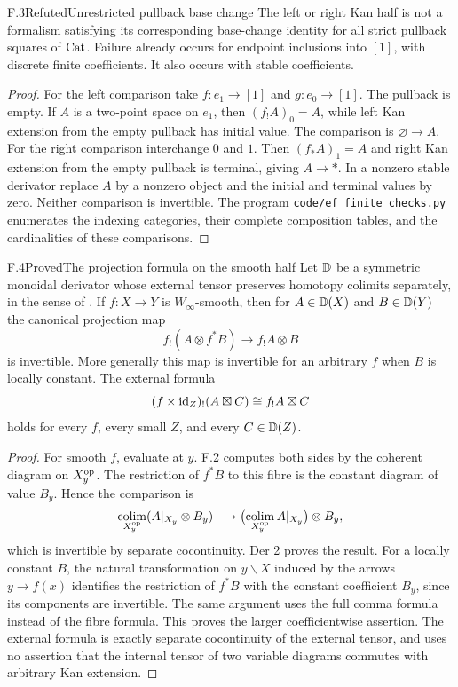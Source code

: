 \begin{claim}{F.3}{Refuted}{Unrestricted pullback base change}
The left or right Kan half is not a formalism satisfying its corresponding base-change identity for all strict pullback squares of $\mathrm{Cat}$. Failure already occurs for endpoint inclusions into $[1]$, with discrete finite coefficients. It also occurs with stable coefficients.
\end{claim}
\begin{proof}
For the left comparison take $f:e_1\to[1]$ and $g:e_0\to[1]$. The pullback is empty. If $A$ is a two-point space on $e_1$, then $(f_!A)_0=A$, while left Kan extension from the empty pullback has initial value. The comparison is $\varnothing\to A$. For the right comparison interchange $0$ and $1$. Then $(f_*A)_1=A$ and right Kan extension from the empty pullback is terminal, giving $A\to *$. In a nonzero stable derivator replace $A$ by a nonzero object and the initial and terminal values by zero. Neither comparison is invertible. The program \texttt{code/ef\_finite\_checks.py} enumerates the indexing categories, their complete composition tables, and the cardinalities of these comparisons.
\end{proof}

\begin{claim}{F.4}{Proved}{The projection formula on the smooth half}
Let $\mathbb D$ be a symmetric monoidal derivator whose external tensor preserves homotopy colimits separately, in the sense of \citet[Definitions 3.23 and 3.25]{EFGPS2014b}. If $f:X\to Y$ is $W_\infty$-smooth, then for $A\in\mathbb D(X)$ and $B\in\mathbb D(Y)$ the canonical projection map
\[
 f_!(A\otimes f^*B)\longrightarrow f_!A\otimes B
\]
is invertible. More generally this map is invertible for an arbitrary $f$ when $B$ is locally constant. The external formula
\[
 (f\times\mathrm{id}_Z)_!(A\boxtimes C)\cong f_!A\boxtimes C
\]
holds for every $f$, every small $Z$, and every $C\in\mathbb D(Z)$.
\end{claim}
\begin{proof}
For smooth $f$, evaluate at $y$. F.2 computes both sides by the coherent diagram on $X_y^{\mathrm{op}}$. The restriction of $f^*B$ to this fibre is the constant diagram of value $B_y$. Hence the comparison is
\[
 \mathop{\mathrm{colim}}_{X_y^{\mathrm{op}}}(A|_{X_y}\otimes B_y)
 \longrightarrow
 \bigl(\mathop{\mathrm{colim}}_{X_y^{\mathrm{op}}}A|_{X_y}\bigr)\otimes B_y,
\]
which is invertible by separate cocontinuity. Der 2 proves the result. For a locally constant $B$, the natural transformation on $y\backslash X$ induced by the arrows $y\to f(x)$ identifies the restriction of $f^*B$ with the constant coefficient $B_y$, since its components are invertible. The same argument uses the full comma formula instead of the fibre formula. This proves the larger coefficientwise assertion. The external formula is exactly separate cocontinuity of the external tensor, and uses no assertion that the internal tensor of two variable diagrams commutes with arbitrary Kan extension.
\end{proof}

